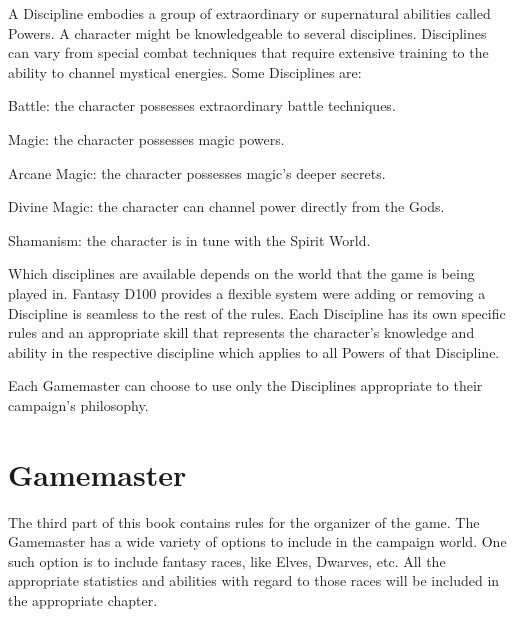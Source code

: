 A Discipline embodies a group of extraordinary or supernatural abilities called Powers. A character might be knowledgeable to several disciplines. Disciplines can vary from special combat techniques that require extensive training to the ability to channel mystical energies. Some Disciplines are:
\begin{rpg-list}
\item Battle: the character possesses extraordinary battle techniques.
\item Magic: the character possesses magic powers.
\item Arcane Magic: the character possesses magic's deeper secrets.
\item Divine Magic: the character can channel power directly from the Gods.
\item Shamanism: the character is in tune with the Spirit World.
\end{rpg-list}

Which disciplines are available depends on the world that the game is being played in. Fantasy D100 provides a flexible system were adding or removing a Discipline is seamless to the rest of the rules. Each Discipline has its own specific rules and an appropriate skill that represents the character's knowledge and ability in the respective discipline which applies to all Powers of that Discipline.

Each Gamemaster can choose to use only the Disciplines appropriate to their campaign's philosophy.


\section{Gamemaster}
The third part of this book contains rules for the organizer of the game. The Gamemaster has a wide variety of options to include in the campaign world. One such option is to include fantasy races, like Elves, Dwarves, etc. All the appropriate statistics and abilities with regard to those races will be included in the appropriate chapter.


